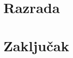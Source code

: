 \documentclass[12pt,oneside]{memoir}
\begin{document}







\chapter{Razrada}
\label{chp:razrada}

\chapter{Zaključak}
\end{document}

